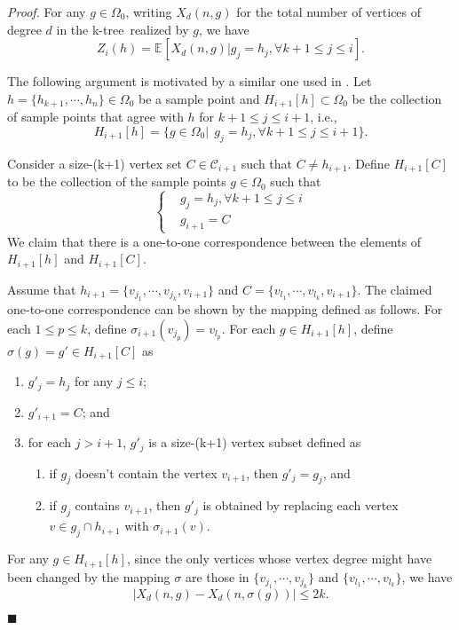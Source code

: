 \documentclass[11pt]{article}
\providecommand{\expectation}[2]{\mathbb{E}_{#2}\left[#1\right]}
\newenvironment{proof}[0]{\textit{Proof.} }{\hfill  $\blacksquare$ }
\providecommand{\tdeg}[2]{X_{#1}(#2)}
\providecommand{\ktree}{k-tree}
\begin{document}
\begin{proof}
For any $g \in \Omega_0$, writing  $\tdeg{d}{n, g}$ for the total number of vertices of degree $d$
in the \ktree\ realized by $g$, we have
$$
  Z_{i}(h) =
  \expectation{\tdeg{d}{n, g} | g_j = h_j,  \forall k + 1\leq j \leq i}{}.
$$

The following argument is motivated by a similar one used in \cite{cooper03}.
Let $h = \{h_{k + 1}, \cdots, h_n\} \in \Omega_0$ be a sample point and
$H_{i+1}[h] \subset \Omega_0$ be the collection of sample points that agree with
$h$ for $k+1\leq j \leq i+1$, i.e.,
$$
 H_{i+1}[h] = \{g\in \Omega_0|\ \ g_j = h_j, \forall k+1\leq j \leq i+1\}.
$$

Consider a size-(k+1) vertex set $C \in \mathcal{C}_{i+1}$ such that
$C \neq h_{i + 1}$. Define $H_{i+1}[C]$ to be the collection of the sample points
$g \in \Omega_0$ such that
\begin{equation}
\left \{
\begin{array}{ll}
&g_j = h_j, \forall k+1\leq j \leq i \\
&g_{i+1} = C
\end{array}
\right.
\end{equation}
We claim that there is a one-to-one correspondence between the elements of
$H_{i+1}[h]$ and $H_{i+1}[C]$.

Assume that $h_{i+1} = \{v_{j_{1}}, \cdots, v_{j_k}, v_{i+1}\}$ and
$C = \{v_{l_1}, \cdots, v_{l_k}, v_{i + 1}\}$.
The claimed one-to-one correspondence
can be shown by the mapping defined as follows. For each $1\leq p \leq k$, define
$\sigma_{i+1}(v_{j_p}) = v_{l_p}$. For each $g \in H_{i+1}[h]$, define $\sigma(g) =
g' \in H_{i+1}[C]$ as
\begin{enumerate}
\item $g'_j = h_j$ for any $j \leq i$;
\item $g'_{i + 1} = C $; and
\item for each $j > i + 1$, $g'_{j}$ is a size-(k+1) vertex subset defined as
\begin{enumerate}
\item if $g_j$ doesn't contain the vertex $v_{i + 1}$, then $g'_j = g_j$, and
\item if $g_j$ contains $v_{i + 1}$, then $g'_j$ is obtained by replacing
 each vertex $v \in g_j \cap h_{i + 1}$ with $\sigma_{i + 1}(v)$.
\end{enumerate}
\end{enumerate}
For any $g \in H_{i + 1}[h]$, since the only vertices whose vertex degree might have been changed by the
mapping $\sigma$ are those
in $\{v_{j_1}, \cdots, v_{j_k}\}$ and $\{v_{l_1}, \cdots, v_{l_k}\}$, we have
$$
  |\tdeg{d}{n, g} - \tdeg{d}{n, \sigma(g)}| \leq 2k.
$$



\end{proof}
\end{document}
